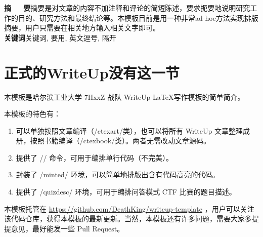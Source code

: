 \documentclass[a4paper,UTF8]{ctexart}
\begin{document}
\title{\pubtitle}

\renewcommand{\Authsep}{, }
\renewcommand{\Authand}{}
\renewcommand{\Authands}{}

\author{7HxzZ}

\author{作者2}

\author{\authorcr 作者3}

\maketitle

\begin{center}
\parbox{0.9\textwidth}{
\textbf{摘~~~要}\quad 摘要是对文章的内容不加注释和评论的简短陈述，要求扼要地说明研究工作的目的、研究方法和最终结论等。本模板目前是用一种非常ad-hoc方法实现排版摘要，用户只需要在相关地方输入相关文字即可。\\
\textbf{关键词}\quad 关键词, 要用, 英文逗号, 隔开\\}
\end{center}


\section{正式的WriteUp没有这一节}

本模板是哈尔滨工业大学 7HxxZ 战队 WriteUp \LaTeX 写作模板的简单简介。

本模板的特色有：

\begin{enumerate}
	\item 可以单独按照文章编译（\code/ctexart/类），也可以将所有 WriteUp 文章整理成册，按照书籍编译（\code/ctexbook/类）。两者无需改动文章源码。
	\item 提供了 \code/\code/ 命令，可用于编排单行代码（不完美）。
	\item 封装了 \code/minted/ 环境，可以简单地排版出含有代码高亮的代码。
	\item 提供了 \code/quizdesc/ 环境，可用于编排问答模式 CTF 比赛的题目描述。
\end{enumerate}

本模板托管在 \url{https://github.com/DeathKing/writeup-template} ，用户可以关注该代码仓库，获得本模板的最新更新。当然，本模板还有许多问题，需要大家多提提意见，最好能发一些 Pull Request。
\end{document}
